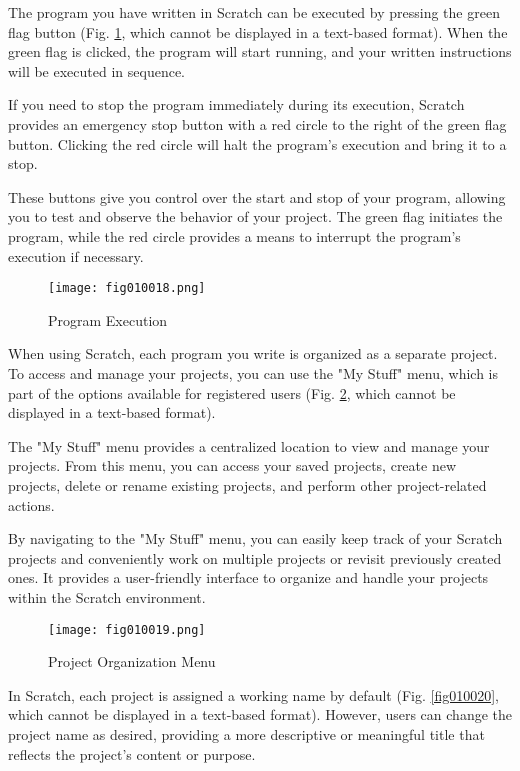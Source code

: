 The program you have written in Scratch can be executed by pressing the green flag button (Fig. \ref{fig010018}, which cannot be displayed in a text-based format). When the green flag is clicked, the program will start running, and your written instructions will be executed in sequence.

If you need to stop the program immediately during its execution, Scratch provides an emergency stop button with a red circle to the right of the green flag button. Clicking the red circle will halt the program's execution and bring it to a stop.

These buttons give you control over the start and stop of your program, allowing you to test and observe the behavior of your project. The green flag initiates the program, while the red circle provides a means to interrupt the program's execution if necessary.

\begin{figure}[H]
   \centering
   \texttt{[image: fig010018.png]}
   \caption{Program Execution}
\label{fig010018}
\end{figure}

When using Scratch, each program you write is organized as a separate project. To access and manage your projects, you can use the "My Stuff" menu, which is part of the options available for registered users (Fig. \ref{fig010019}, which cannot be displayed in a text-based format).

The "My Stuff" menu provides a centralized location to view and manage your projects. From this menu, you can access your saved projects, create new projects, delete or rename existing projects, and perform other project-related actions.

By navigating to the "My Stuff" menu, you can easily keep track of your Scratch projects and conveniently work on multiple projects or revisit previously created ones. It provides a user-friendly interface to organize and handle your projects within the Scratch environment.

\begin{figure}[H]
   \centering
   \texttt{[image: fig010019.png]}
   \caption{Project Organization Menu}
\label{fig010019}
\end{figure}

In Scratch, each project is assigned a working name by default (Fig. \ref{fig010020}, which cannot be displayed in a text-based format). However, users can change the project name as desired, providing a more descriptive or meaningful title that reflects the project's content or purpose.

